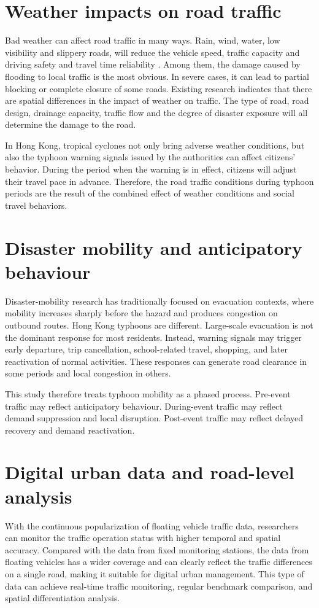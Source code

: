 \documentclass[12pt,a4paper]{report}
\begin{document}
\section{Weather impacts on road traffic}
Bad weather can affect road traffic in many ways. Rain, wind, water, low visibility and slippery roads, will reduce the vehicle speed, traffic capacity and driving safety and travel time reliability \parencite{koetse2009impact,mathew2022quantifying}. Among them, the damage caused by flooding to local traffic is the most obvious. In severe cases, it can lead to partial blocking or complete closure of some roads\parencite{pregnolato2017impact}.  Existing research indicates that there are spatial differences in the impact of weather on traffic. The type of road, road design, drainage capacity, traffic flow and the degree of disaster exposure will all determine the damage to the road.

In Hong Kong, tropical cyclones not only bring adverse weather conditions, but also the typhoon warning signals issued by the authorities can affect citizens' behavior. During the period when the warning is in effect, citizens will adjust their travel pace in advance. Therefore, the road traffic conditions during typhoon periods are the result of the combined effect of weather conditions and social travel behaviors.

\section{Disaster mobility and anticipatory behaviour}
Disaster-mobility research has traditionally focused on evacuation contexts, where mobility increases sharply before the hazard and produces congestion on outbound routes. Hong Kong typhoons are different. Large-scale evacuation is not the dominant response for most residents. Instead, warning signals may trigger early departure, trip cancellation, school-related travel, shopping, and later reactivation of normal activities. These responses can generate road clearance in some periods and local congestion in others.

This study therefore treats typhoon mobility as a phased process. Pre-event traffic may reflect anticipatory behaviour. During-event traffic may reflect demand suppression and local disruption. Post-event traffic may reflect delayed recovery and demand reactivation.

\section{Digital urban data and road-level analysis}
With the continuous popularization of floating vehicle traffic data, researchers can monitor the traffic operation status with higher temporal and spatial accuracy. Compared with the data from fixed monitoring stations, the data from floating vehicles has a wider coverage and can clearly reflect the traffic differences on a single road, making it suitable for digital urban management. This type of data can achieve real-time traffic monitoring, regular benchmark comparison, and spatial differentiation analysis.
\end{document}
